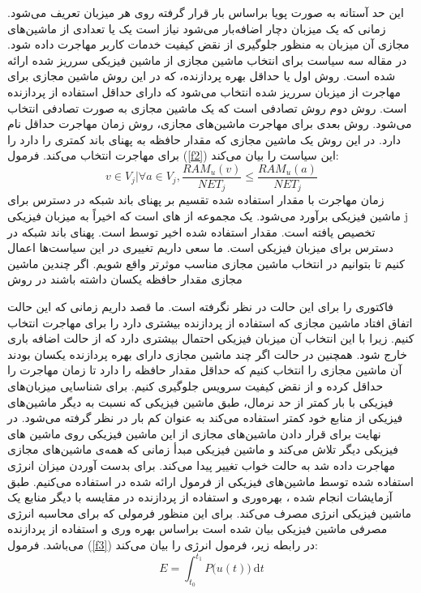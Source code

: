 این حد آستانه به صورت پویا براساس بار قرار گرفته روی هر میزبان تعریف می‌شود. زمانی که یک میزبان دچار اضافه‌بار می‌شود نیاز است یک یا تعدادی از ماشین‌های مجازی آن میزبان به منظور جلوگیری از نقض کیفیت خدمات کاربر مهاجرت داده شود. در مقاله 
\cite{num15}
سه سیاست برای انتخاب ماشین مجازی از ماشین فیزیکی سرریز شده ارائه شده است. روش اول  
یا حداقل بهره پردازنده، که در این روش ماشین مجازی برای مهاجرت از میزبان سرریز شده انتخاب می‌شود که دارای حداقل استفاده از پردازنده است. روش دوم روش تصادفی است که یک ماشین مجازی به صورت تصادفی انتخاب می‌شود. روش بعدی برای مهاجرت ماشین‌های مجازی، روش زمان مهاجرت حداقل
نام دارد. در این روش یک ماشین مجازی که مقدار حافظه به پهنای باند کمتری را دارد را برای مهاجرت انتخاب می‌کند. فرمول
(\ref{f2})
 این سیاست را بیان می‌کند:
\cite{num15}
\begin{equation}
v\in V_j|\forall a \in V_j, \frac{RAM_u(v)}{NET_j} \leq \frac{RAM_u(a)}{NET_j}
\label{f2}
\end{equation}
زمان مهاجرت با مقدار
استفاده شده
تقسیم بر پهنای باند شبکه در دسترس برای ماشین فیزیکی
  برآورد می‌شود. یک مجموعه از
 ‌های است که اخیراً به میزبان فیزیکی j  تخصیص یافته است.  مقدار 
  استفاده شده اخیر توسط
   است.  پهنای باند شبکه در دسترس برای میزبان فیزیکی 
    است.
ما سعی داریم تغییری در این سیاست‌ها اعمال کنیم تا بتوانیم در انتخاب ماشین مجازی مناسب موثرتر واقع شویم. اگر چندین ماشین مجازی مقدار حافظه یکسان داشته باشند در روش 

 فاکتوری را برای این حالت در نظر نگرفته است. ما قصد داریم زمانی که این حالت اتفاق افتاد ماشین مجازی که استفاده از پردازنده بیشتری دارد را برای مهاجرت انتخاب کنیم. زیرا با این انتخاب آن میزبان فیزیکی احتمال بیشتری دارد که از حالت اضافه باری خارج شود. همچنین در حالت
 اگر چند ماشین مجازی دارای بهره پردازنده یکسان بودند آن ماشین مجازی را انتخاب کنیم که حداقل مقدار حافظه را دارد تا زمان مهاجرت را حداقل کرده و از نقض کیفیت سرویس جلوگیری کنیم.
برای شناسایی میزبان‌های فیزیکی با بار کمتر از حد نرمال، طبق 
\cite{num15}
ماشین فیزیکی که نسبت به دیگر ماشین‌های فیزیکی از منابع خود کمتر استفاده می‌کند به عنوان کم بار در نظر گرفته می‌شود. در نهایت برای قرار دادن ماشین‌های مجازی از این ماشین فیزیکی روی ماشین ‌های فیزیکی دیگر تلاش می‌کند و ماشین فیزیکی مبدأ زمانی که همه‌ی ماشین‌های مجازی مهاجرت داده شد به حالت خواب تغییر پیدا می‌کند.
برای بدست آوردن میزان انرژی استفاده شده توسط ماشین‌های فیزیکی از  فرمول ارائه شده در  
\cite{num15}
استفاده می‌کنیم­. طبق آزمایشات انجام شده ، بهره‌وری و استفاده از پردازنده در مقایسه با دیگر منابع یک ماشین فیزیکی انرژی مصرف می‌کند. برای این منظور فرمولی که برای محاسبه انرژی مصرفی ماشین فیزیکی بیان شده است براساس بهره وری و استفاده از پردازنده می‌باشد. فرمول
(\ref{f3})
 در رابطه زیر، فرمول انرژی را بیان می‌کند­:
\cite{num15}
\begin{equation}
E=\int_{t_0}^{t_1}P\Big(u(t)\Big)\:\mathrm{d}t
\label{f3}
\end{equation}
 
